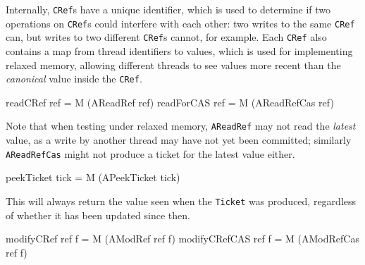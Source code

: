 
Internally, \verb|CRef|s have a unique identifier, which is used to
determine if two operations on \verb|CRef|s could interfere with each
other: two writes to the same \verb|CRef| can, but writes to two
different \verb|CRef|s cannot, for example. Each \verb|CRef| also
contains a map from thread identifiers to values, which is used for
implementing relaxed memory, allowing different threads to see values
more recent than the \emph{canonical} value inside the \verb|CRef|.

\begin{haskellcode}
readCRef   ref = M (AReadRef    ref)
readForCAS ref = M (AReadRefCas ref)
\end{haskellcode}



Note that when testing under relaxed memory, \verb|AReadRef| may not
read the \emph{latest} value, as a write by another thread may have
not yet been committed; similarly \verb|AReadRefCas| might not produce
a ticket for the latest value either.

\begin{haskellcode}
peekTicket tick = M (APeekTicket tick)
\end{haskellcode}


This will always return the value seen when the \verb|Ticket| was
produced, regardless of whether it has been updated since then.

\begin{haskellcode}
modifyCRef    ref f = M (AModRef    ref f)
modifyCRefCAS ref f = M (AModRefCas ref f)
\end{haskellcode}



